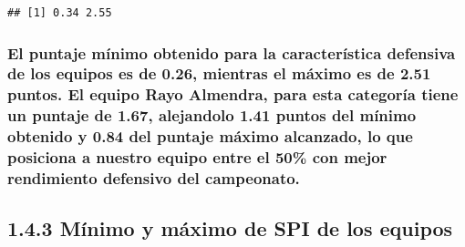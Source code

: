 \documentclass[]{article}
\newenvironment{Shaded}{\begin{snugshade}}{\end{snugshade}}
\newcommand{\CommentTok}[1]{\textcolor[rgb]{0.56,0.35,0.01}{\textit{#1}}}
\newcommand{\KeywordTok}[1]{\textcolor[rgb]{0.13,0.29,0.53}{\textbf{#1}}}
\newcommand{\NormalTok}[1]{#1}
\newcommand{\OperatorTok}[1]{\textcolor[rgb]{0.81,0.36,0.00}{\textbf{#1}}}
\begin{document}
\begin{Shaded}
\end{Shaded}

\begin{verbatim}
## [1] 0.34 2.55
\end{verbatim}

\hypertarget{el-puntaje-minimo-obtenido-para-la-caracteristica-defensiva-de-los-equipos-es-de-0.26-mientras-el-maximo-es-de-2.51-puntos.-el-equipo-rayo-almendra-para-esta-categoria-tiene-un-puntaje-de-1.67-alejandolo-1.41-puntos-del-minimo-obtenido-y-0.84-del-puntaje-maximo-alcanzado-lo-que-posiciona-a-nuestro-equipo-entre-el-50-con-mejor-rendimiento-defensivo-del-campeonato.}{%
\subsubsection{El puntaje mínimo obtenido para la característica
defensiva de los equipos es de 0.26, mientras el máximo es de 2.51
puntos. El equipo Rayo Almendra, para esta categoría tiene un puntaje de
1.67, alejandolo 1.41 puntos del mínimo obtenido y 0.84 del puntaje
máximo alcanzado, lo que posiciona a nuestro equipo entre el 50\% con
mejor rendimiento defensivo del
campeonato.}\label{el-puntaje-minimo-obtenido-para-la-caracteristica-defensiva-de-los-equipos-es-de-0.26-mientras-el-maximo-es-de-2.51-puntos.-el-equipo-rayo-almendra-para-esta-categoria-tiene-un-puntaje-de-1.67-alejandolo-1.41-puntos-del-minimo-obtenido-y-0.84-del-puntaje-maximo-alcanzado-lo-que-posiciona-a-nuestro-equipo-entre-el-50-con-mejor-rendimiento-defensivo-del-campeonato.}}

\hypertarget{minimo-y-maximo-de-spi-de-los-equipos}{%
\subsection{1.4.3 Mínimo y máximo de SPI de los
equipos}\label{minimo-y-maximo-de-spi-de-los-equipos}}

\begin{Shaded}
\end{Shaded}
\end{document}
